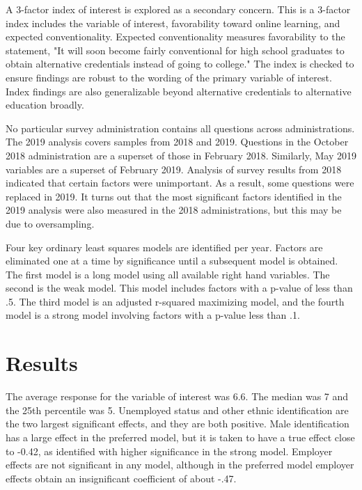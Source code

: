 \documentclass[review]{elsarticle}
\begin{document}
        A 3-factor index of interest is explored as a secondary concern.
        This is a 3-factor index includes the variable of interest, favorability toward online learning,
        and expected conventionality.
        Expected conventionality measures favorability to the statement,
        "It will soon become fairly conventional for high school graduates to obtain alternative credentials
        instead of going to college."
        The index is checked to ensure findings are robust to the wording of the primary variable of interest.
        Index findings are also generalizable beyond alternative credentials to alternative education broadly.

        No particular survey administration contains all questions across administrations.
        The 2019 analysis covers samples from 2018 and 2019.
        Questions in the October 2018 administration are a superset of those in February 2018.
        Similarly, May 2019 variables are a superset of February 2019.
        Analysis of survey results from 2018 indicated that certain factors were unimportant.
        As a result, some questions were replaced in 2019.
        It turns out that the most significant factors identified in the
        2019 analysis were also measured in the 2018 administrations, but this may be due to oversampling.
        
        Four key ordinary least squares models are identified per year.
        Factors are eliminated one at a time by significance until a subsequent model is obtained.
        The first model is a long model using all available right hand variables.
        The second is the weak model. This model includes factors with a p-value of less than .5.
        The third model is an adjusted r-squared maximizing model, and the fourth
        model is a strong model involving factors with a p-value less than .1.

        \section{Results}

        The average response for the variable of interest was 6.6.
        The median was 7 and the 25th percentile was 5.
        Unemployed status and other ethnic identification are the two largest significant effects,
        and they are both positive.
        Male identification has a large effect in the preferred model, but it is taken to have a true
        effect close to -0.42,
        as identified with higher significance in the strong model.
        Employer effects are not significant in any model, although in the preferred
        model employer effects obtain an insignificant coefficient of about -.47.
\end{document}
